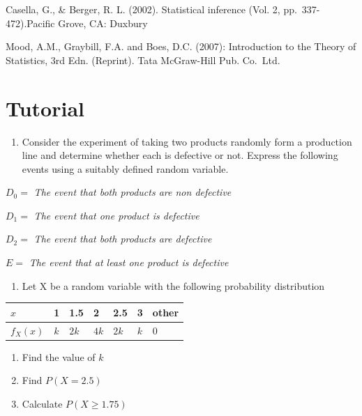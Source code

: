 \documentclass[]{book}
\providecommand{\tightlist}{%
  \setlength{\itemsep}{0pt}\setlength{\parskip}{0pt}}
\begin{document}
Casella, G., \& Berger, R. L. (2002). Statistical inference (Vol. 2, pp.~337-472).Pacific Grove, CA: Duxbury

Mood, A.M., Graybill, F.A. and Boes, D.C. (2007): Introduction to the Theory of Statistics, 3rd Edn. (Reprint). Tata McGraw-Hill Pub. Co.~Ltd.

\newpage
{}

\hypertarget{tutorial}{%
\section*{Tutorial}\label{tutorial}}

\begin{enumerate}
\def\labelenumi{\arabic{enumi}.}
\tightlist
\item
  Consider the experiment of taking two products randomly form a production line and determine whether each is defective or not. Express the following events using a suitably defined random variable.
\end{enumerate}

\(D_0=\) \emph{The event that both products are non defective}

\(D_1=\) \emph{The event that one product is defective}

\(D_2=\) \emph{The event that both products are defective}

\(E=\) \emph{The event that at least one product is defective}

\begin{enumerate}
\def\labelenumi{\arabic{enumi}.}
\setcounter{enumi}{1}
\tightlist
\item
  Let X be a random variable with the following probability distribution
\end{enumerate}

\begin{longtable}[]{@{}lllllll@{}}
\toprule
\(x\) & 1 & 1.5 & 2 & 2.5 & 3 & other\tabularnewline
\midrule
\endhead
\(f_X(x)\) & \(k\) & \(2k\) & \(4k\) & \(2k\) & \(k\) & 0\tabularnewline
\bottomrule
\end{longtable}

\begin{enumerate}
\def\labelenumi{(\alph{enumi})}
\tightlist
\item
  Find the value of \(k\)
\item
  Find \(P(X = 2.5)\)
\item
  Calculate \(P (X \geq 1.75)\)
\end{enumerate}
\end{document}
